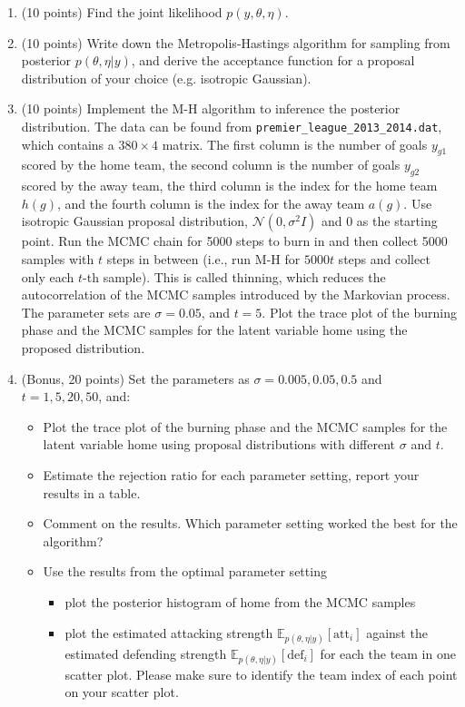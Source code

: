 \documentclass{article}
\begin{document}
\begin{enumerate}
\item (10 points) Find the joint likelihood $p(y, \theta, \eta)$.
\item (10 points) Write down the Metropolis-Hastings algorithm for sampling from posterior $p(\theta, \eta|y)$, and
derive the acceptance function for a proposal distribution of your choice (e.g. isotropic Gaussian).
\item (10 points) Implement the M-H algorithm to inference the posterior distribution. The data can be found
from \texttt{premier\_league\_2013\_2014.dat}, which contains a $380 \times 4$ matrix. The first column is the number
of goals $y_{g1}$ scored by the home team, the second column is the number of goals $y_{g2}$ scored by the away
team, the third column is the index for the home team $h(g)$, and the fourth column is the index for the
away team $a(g)$. Use isotropic Gaussian proposal distribution, $\mathcal{N}(0, \sigma^2I)$ and 0 as the starting point.
Run the MCMC chain for 5000 steps to burn in and then collect 5000 samples with $t$ steps in between
(i.e., run M-H for $5000t$ steps and collect only each $t$-th sample). This is called thinning, which reduces
the autocorrelation of the MCMC samples introduced by the Markovian process. The parameter sets
are $\sigma = 0.05$, and $t = 5$. Plot the trace plot of the burning phase and the MCMC samples for the latent
variable home using the proposed distribution.

\item (Bonus, 20 points) Set the parameters as $\sigma = 0.005, 0.05, 0.5$ and $t = 1, 5, 20, 50$, and:
\begin{itemize}
\item Plot the trace plot of the burning phase and the MCMC samples for the latent variable home using
proposal distributions with different $\sigma$ and $t$.
\item Estimate the rejection ratio for each parameter setting, report your results in a table.
\item Comment on the results. Which parameter setting worked the best for the algorithm?
\item Use the results from the optimal parameter setting
\begin{itemize}
\item plot the posterior histogram of home from the MCMC samples
\item plot the estimated attacking strength $\mathbb{E}_{p(\theta,\eta|y)}[\text{att}_i]$ against the estimated defending strength
$\mathbb{E}_{p(\theta,\eta|y)}[\text{def}_i]$ for each the team in one scatter plot. Please make sure to identify the team
index of each point on your scatter plot.
\end{itemize}
\end{itemize}
\end{enumerate}
\end{document}

